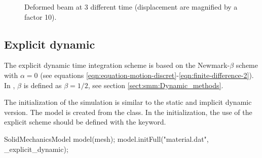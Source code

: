 \begin{figure}[!htb]
  \centering
  \setlength{\unitlength}{0.1\textwidth}

  \caption{Deformed beam at 3 different time (displacement are
    magnified by a factor 10).}
  \label{fig:smm:implicit:dynamic_solution}
\end{figure}

\subsection{Explicit dynamic}

The explicit  dynamic time  integration scheme is  based on  the Newmark-$\beta$
scheme            with            $\alpha=0$           (see            equations
\ref{eqn:equation-motion-discret}-\ref{eqn:finite-difference-2}).   In  \akantu,
$\beta$ is defined as $\beta=1/2$, see section \ref{sect:smm:Dynamic_methods}.

The  initialization of  the simulation  is similar  to the  static  and implicit
dynamic  version.   The model  is  created  from the  
class.   In the  initialization, the  use of  the explicit  scheme  should be
defined with the  keyword.

\begin{cpp}
  SolidMechanicsModel model(mesh);
  model.initFull("material.dat", _explicit_dynamic);
\end{cpp}


